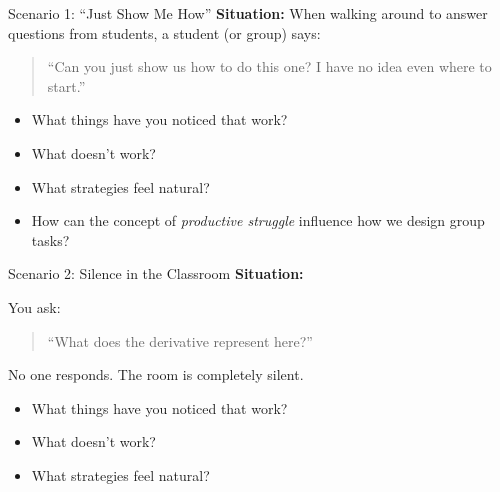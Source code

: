 \documentclass[dvipsnames]{beamer}
\begin{document}
\begin{frame}{Scenario 1: “Just Show Me How”}
\textbf{Situation:}
When walking around to answer questions from students, a student (or group) says:
\begin{quote}
“Can you just show us how to do this one? I have no idea even where to start.”
\end{quote}
\begin{itemize}
    \item What things have you noticed that work?
    \item What doesn’t work?
    \item What strategies feel natural?
    \item How can the concept of \emph{productive struggle} influence how we design group tasks?
\end{itemize}
\end{frame}

\begin{frame}{Scenario 2: Silence in the Classroom}
\textbf{Situation:}

You ask:
\begin{quote}
“What does the derivative represent here?”
\end{quote}

No one responds. The room is completely silent.
\begin{itemize}
    \item What things have you noticed that work?
    \item What doesn’t work?
    \item What strategies feel natural?
\end{itemize}
\end{frame}
\end{document}
